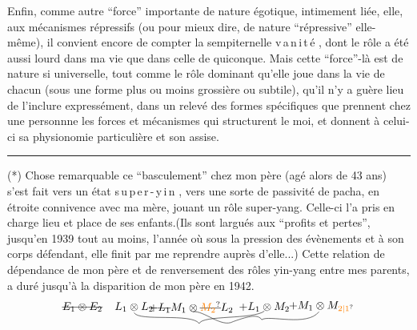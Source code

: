Enfin, comme autre ``force'' importante de nature égotique, intimement liée, elle, aux mécanismes répressifs (ou pour mieux dire, de nature ``répressive'' elle-même), il convient encore de compter la sempiternelle v\,a\,n\,i\,t\,é , dont le rôle a été aussi lourd dans ma vie que dans celle de quiconque. Mais cette ``force''-là est de nature si universelle, tout comme le rôle dominant qu'elle joue dans la vie de chacun (sous une forme plus ou moins grossière ou subtile), qu'il n'y a guère lieu de l'inclure expressément, dans un relevé des formes spécifiques que prennent chez une personnne les forces et mécanismes qui structurent le moi, et donnent à celui-ci sa physionomie particulière et son assise.

\noindent\rule{5em}{0.3pt}\par
(*) Chose remarquable\handwritten{,} ce ``basculement'' chez mon père (agé alors de 43 ans) s'est fait vers un état s\,u\,p\,e\,r\,-\,y\,i\,n , vers une sorte de passivité de pacha, en étroite connivence avec ma mère, jouant un rôle super-yang. Celle-ci l'a pris en charge \hspace{1em} lieu et place de ses enfants.(Ils sont largués aux ``profits et pertes'', jusqu'en 1939 tout au moins, l'année où sous la pression des évènements et à son corps défendant, elle finit par me reprendre auprès d'elle...) Cette relation de dépendance de mon père et de renversement des rôles yin-yang entre mes parents, a duré jusqu'à la disparition de mon père en 1942.
\[
\deleted{E_1\otimes E_2}\quad
\begin{tikzpicture}[baseline=(a.base)]
\node[inner sep=1pt] (a) at (0,0) {$L_1\otimes L_2$};
\node[inner sep=1pt] (b) at (1.8,0) {$+\deleted{L_1}M_1\otimes\deleted{\unsure{M_2}}L_2$};
\node[inner sep=1pt] (c) at (4.1,0) {$+L_1\otimes M_2$};
\node[inner sep=1pt] (d) at (5.9,0) {$+M_1\otimes M_{\unsure{2|1}}$};
\draw (0,-.18) .. controls (.15,-.47) and (1.8,-.18) .. (2.05,-.52) .. controls (2.15,-.25) and (3.75,-.4) .. (4.1,-.13);
\draw (1.85,-.15) .. controls (2.2,-.1) and (2.75,-.67) .. (3.12,-.46) .. controls (3.65,-.27) and (3.9,-.23) .. (4.02,-.4) .. controls (4.24,-.24) and (5.45,-.63) .. (5.82,-.15);
\end{tikzpicture}
\]


